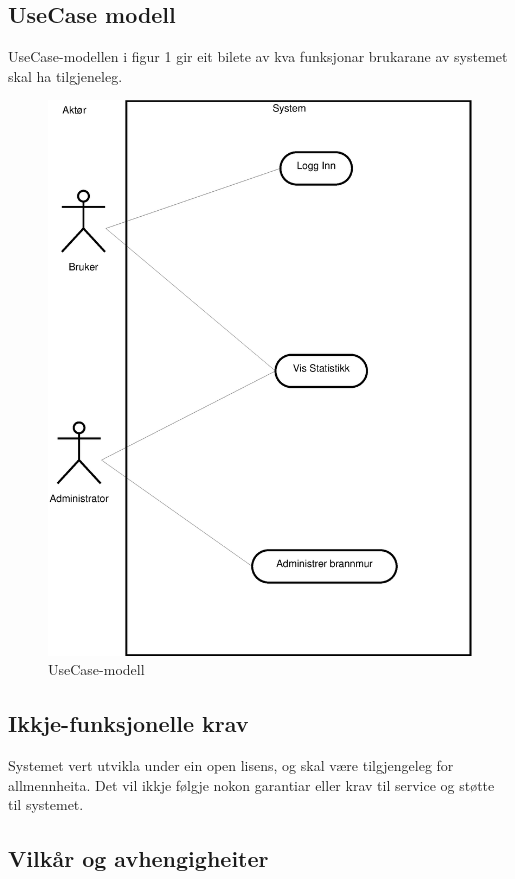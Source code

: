 \documentclass[nynorsk,12pt,a4paper]{article}
\begin{document}
\subsection{UseCase modell}
UseCase-modellen i figur 1 gir eit bilete av kva funksjonar brukarane av systemet skal ha tilgjeneleg.
\begin{figure}[h!]
	\includegraphics[scale=0.5]{imgs/UC.eps}
	\caption{UseCase-modell}
\end{figure}

\subsection{Ikkje-funksjonelle krav}
Systemet vert utvikla under ein open lisens, og skal være tilgjengeleg for allmennheita. Det vil ikkje følgje nokon garantiar eller krav til service og støtte til systemet. 
\subsection{Vilkår og avhengigheiter}
\end{document}
